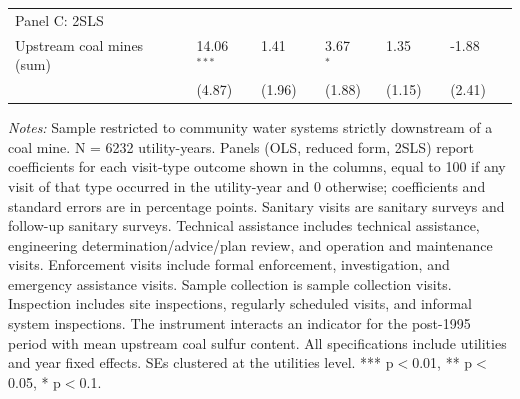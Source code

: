 \begin{table}[htbp]
{\begin{tabular}{p{5.5cm}>{\raggedleft\arraybackslash}p{2.1cm}>{\raggedleft\arraybackslash}p{2.1cm}>{\raggedleft\arraybackslash}p{2.1cm}>{\raggedleft\arraybackslash}p{2.1cm}>{\raggedleft\arraybackslash}p{2.1cm}}
\hline
\multicolumn{6}{l}{Panel C: 2SLS} \\
Upstream coal mines (sum) & \phantom{(}\phantom{-}14.06$^{***}$ & \phantom{(}\phantom{-}1.41$^{\phantom{*}\phantom{*}\phantom{*}}$ & \phantom{(}\phantom{-}3.67$^{*\phantom{*}\phantom{*}}$ & \phantom{(}\phantom{-}1.35$^{\phantom{*}\phantom{*}\phantom{*}}$ & \phantom{(}-1.88$^{\phantom{*}\phantom{*}\phantom{*}}$ \\
 & (\phantom{-}\phantom{0}4.87)\phantom{$^{***}$} & (\phantom{-}1.96)\phantom{$^{***}$} & (\phantom{-}1.88)\phantom{$^{***}$} & (\phantom{-}1.15)\phantom{$^{***}$} & (\phantom{-}2.41)\phantom{$^{***}$} \\
\hline\hline
\end{tabular}
}
\begin{minipage}{16cm}
\vspace{4pt}
\footnotesize
\raggedright
\textit{Notes:} Sample restricted to community water systems strictly downstream of a coal mine. N = 6232 utility-years. Panels (OLS, reduced form, 2SLS) report coefficients for each visit-type outcome shown in the columns, equal to 100 if any visit of that type occurred in the utility-year and 0 otherwise; coefficients and standard errors are in percentage points. Sanitary visits are sanitary surveys and follow-up sanitary surveys. Technical assistance includes technical assistance, engineering determination/advice/plan review, and operation and maintenance visits. Enforcement visits include formal enforcement, investigation, and emergency assistance visits. Sample collection is sample collection visits. Inspection includes site inspections, regularly scheduled visits, and informal system inspections. The instrument interacts an indicator for the post-1995 period with mean upstream coal sulfur content. All specifications include utilities and year fixed effects. SEs clustered at the utilities level. *** p$<$0.01, ** p$<$0.05, * p$<$0.1.
\end{minipage}
\end{table}
